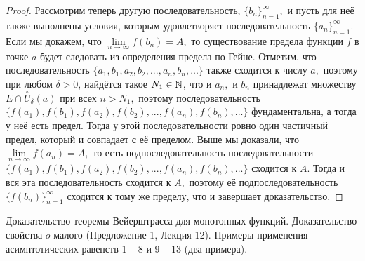 \begin{proof}
    Рассмотрим теперь другую последовательность,
    $\{b_n\}_{n=1}^{\infty},$
    и пусть для неё также выполнены условия, которым
    удовлетворяет последовательность
    $\{a_n\}_{n=1}^{\infty}.$ Если мы докажем, что
    $\lim\limits_{n\rightarrow\infty}f(b_n)=A,$
    то существование предела функции $f$ в точке
    $a$ будет следовать из определения предела
    по Гейне. Отметим, что последовательность
    $\{a_1, b_1, a_2, b_2, ..., a_n, b_n, ...\}$
    также сходится к числу $a,$ поэтому при любом
    $\delta>0$,
    найдётся такое $N_1 \in \mathbb{N}$, что и
    $a_n,$ и $b_n$ принадлежат множеству
    $E\cap\stackrel{\circ}{U}_{\delta}(a)$
    при всех $n > N_1,$ поэтому последовательность
    $\{f(a_1), f(b_1), f(a_2),
        f(b_2), ..., f(a_n), f(b_n), ...\}$
    фундаментальна, а тогда у неё есть предел.
    Тогда у этой последовательности ровно
    один частичный предел, который и совпадает
    с её пределом. Выше мы доказали, что
    $\lim\limits_{n\rightarrow\infty}f(a_n)=A,$
    то есть подпоследовательность
    последовательности $\{f(a_1), f(b_1), f(a_2),
        f(b_2), ..., f(a_n), f(b_n), \textrm{...}\}$
    сходится к $A.$ Тогда и вся
    эта последовательность сходится к $A,$
    поэтому её подпоследовательность
    $\{f(b_n)\}_{n=1}^{\infty}$ сходится к тому
    же пределу, что и завершает доказательство.
\end{proof}


\newpage
\begin{problem}
Доказательство теоремы Вейерштрасса для монотонных функций. Доказательство свойства $o$-малого (Предложение 1, Лекция 12). Примеры применения асимптотических равенств 1 – 8 и 9 – 13 (два примера).
\end{problem}

